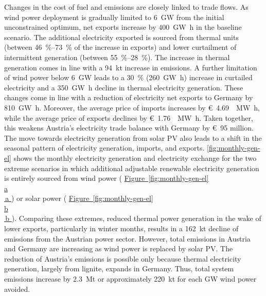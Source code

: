 \documentclass[review, 3p, times, 12pt, authoryear]{elsarticle}
\newcommand*{\figref}[2][]{%
    \hyperref[{fig:#2}]{%
        Figure~\ref*{fig:#2}%
        \ifx\\#1\\%
        \else
        \,#1%
        \fi
    }%
}
\begin{document}
    Changes in the cost of fuel and  emissions are closely linked to trade flows.
    As wind power deployment is gradually limited to \SI{6}{\giga\watt} from the initial unconstrained optimum, net exports increase by \SI{400}{\giga\watt\hour} in the baseline scenario.
    The additional electricity exported is sourced from thermal units (between \SIrange{46}{73}{\percent} of the increase in exports) and lower curtailment of intermittent generation (between \SIrange{55}{28}{\percent}).
    The increase in thermal generation comes in line with a \SI{94}{\kilo\tonne} increase in  emissions.
    A further limitation of wind power below \SI{6}{\giga\watt} leads to a \SI{30}{\percent} (\SI{+260}{\giga\watt\hour}) increase in curtailed electricity and a \SI{350}{\giga\watt\hour} decline in thermal electricity generation.
    These changes come in line with a reduction of electricity net exports to Germany by \SI{810}{\giga\watt\hour}.
    Moreover, the average price of imports increases by \SI[per-mode=symbol,sticky-per, bracket-unit-denominator=false]{4.69}[\euro]{\per\mega\watt\hour}, while the average price of exports declines by \SI[per-mode=symbol,sticky-per, bracket-unit-denominator=false]{1.76}[\euro]{\per\mega\watt\hour}.
    Taken together, this weakens Austria's electricity trade balance with Germany by \SI{95}[\euro]{} million.
    The move towards electricity generation from solar PV also leads to a shift in the seasonal pattern of electricity generation, imports, and exports. \autoref{fig:monthly-gen-el} shows the monthly electricity generation and electricity exchange for the two extreme scenarios in which additional adjustable renewable electricity generation is entirely sourced from wind power (\figref[a]{monthly-gen-el}) or solar power (\figref[b]{monthly-gen-el}).
    Comparing these extremes, reduced thermal power generation in the wake of lower exports, particularly in winter months, results in a \SI{162}{\kilo\tonne} decline of  emissions from the Austrian power sector.
    However, total emissions in Austria and Germany are increasing as wind power is replaced by solar PV.
    The reduction of Austria's  emissions is possible only because thermal electricity generation, largely from lignite, expands in Germany.
    Thus, total system emissions increase by \SI{2.3}{\mega\tonne} or approximately \SI{220}{\kilo\tonne} for each \si{\giga\watt} wind power avoided.
\end{document}
